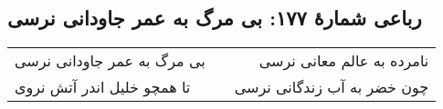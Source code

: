 \begin{center}
\section*{رباعی شمارهٔ ۱۷۷: بی مرگ به عمر جاودانی نرسی}
\label{sec:177}
\begin{longtable}{l p{0.5cm} r}
بی مرگ به عمر جاودانی نرسی
&&
نامرده به عالم معانی نرسی
\\
تا همچو خلیل اندر آتش نروی
&&
چون خضر به آب زندگانی نرسی
\\
\end{longtable}
\end{center}
